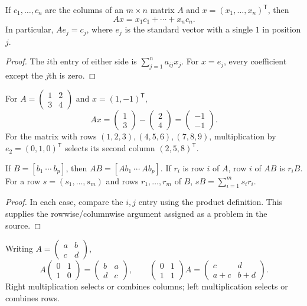 \begin{lemma}\label{lem:algebra-columns}
If $c_1,\ldots,c_n$ are the columns of an $m\times n$ matrix $A$ and
$x=(x_1,\ldots,x_n)^{\mathsf T}$, then
\[
Ax=x_1c_1+\cdots+x_nc_n.
\]
In particular, $Ae_j=c_j$, where $e_j$ is the standard vector with a single
$1$ in position $j$.
\end{lemma}
\begin{proof}
The $i$th entry of either side is $\sum_{j=1}^n a_{ij}x_j$.
For $x=e_j$, every coefficient except the $j$th is zero.
\end{proof}
\begin{example}
For $A=\begin{pmatrix}1&2\\3&4\end{pmatrix}$ and
$x=(1,-1)^{\mathsf T}$,
\[
Ax=\begin{pmatrix}1\\3\end{pmatrix}-\begin{pmatrix}2\\4\end{pmatrix}
=\begin{pmatrix}-1\\-1\end{pmatrix}.
\]
For the matrix with rows $(1,2,3),(4,5,6),(7,8,9)$, multiplication by
$e_2=(0,1,0)^{\mathsf T}$ selects its second column $(2,5,8)^{\mathsf T}$.
\end{example}

\begin{lemma}
If $B=[b_1\ \cdots\ b_p]$, then
$AB=[Ab_1\ \cdots\ Ab_p]$.
If $r_i$ is row $i$ of $A$, row $i$ of $AB$ is $r_iB$.
For a row $s=(s_1,\ldots,s_m)$ and rows $r_1,\ldots,r_m$ of $B$,
$sB=\sum_{i=1}^m s_ir_i$.
\end{lemma}
\begin{proof}
In each case, compare the $i,j$ entry using the product definition.
This supplies the rowwise/columnwise argument assigned as a problem in the source.
\end{proof}

\begin{example}
Writing $A=\begin{pmatrix}a&b\\c&d\end{pmatrix}$,
\[
A\begin{pmatrix}0&1\\1&0\end{pmatrix}
=\begin{pmatrix}b&a\\d&c\end{pmatrix},\qquad
\begin{pmatrix}0&1\\1&1\end{pmatrix}A
=\begin{pmatrix}c&d\\a+c&b+d\end{pmatrix}.
\]
Right multiplication selects or combines columns; left multiplication
selects or combines rows.
\end{example}

